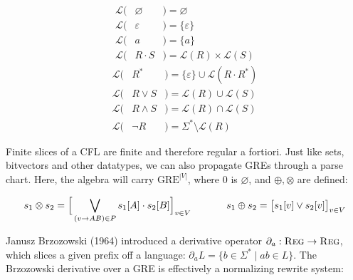 \documentclass[runningheads]{llncs}
\begin{document}
\begin{multicols}{2}
  \begin{eqnarray*}
    \mathcal{L}(& \varnothing & ) = \varnothing \\
    \mathcal{L}(& \varepsilon & ) = \{\varepsilon\} \\
    \mathcal{L}(& a           & ) = \{a\}\\
    \mathcal{L}(& R\cdot S    & ) = \mathcal{L}(R) \times \mathcal{L}(S)
  \end{eqnarray*} \break\vspace{-0.45cm}
  \begin{eqnarray*}
    \mathcal{L}(& R^*         & ) = \{\varepsilon\} \cup \mathcal{L}(R\cdot R^*)\\
    \mathcal{L}(& R\vee S     & ) = \mathcal{L}(R) \cup \mathcal{L}(S)\\
    \mathcal{L}(& R\land S    & ) = \mathcal{L}(R) \cap \mathcal{L}(S)\\
    \mathcal{L}(& \neg R      & ) = \Sigma^* \setminus \mathcal{L}(R)
  \end{eqnarray*}
\end{multicols}

Finite slices of a CFL are finite and therefore regular a fortiori. Just like sets, bitvectors and other datatypes, we can also propagate GREs through a parse chart. Here, the algebra will carry $\text{GRE}^{|V|}$, where 0 is $\varnothing$, and $\oplus, \otimes$ are defined:

\begin{equation*}
  s_1\otimes s_2 = \Big[\bigvee_{(v \rightarrow AB) \in P} s_1[A] \cdot s_2[B] \Big]_{v \in V} \phantom{----}
  s_1\oplus s_2 = \big[s_1[v] \vee s_2[v]\big]_{v \in V} \\
\end{equation*}


Janusz Brzozowski (1964) introduced a derivative operator $\partial_a: \textsc{Reg} \rightarrow \textsc{Reg}$, which slices a given prefix off a language: $\partial_a L = \{b \in \Sigma^* \mid ab \in L\}$. The Brzozowski derivative over a GRE is effectively a normalizing rewrite system:\vspace{-0.5cm}
\end{document}
